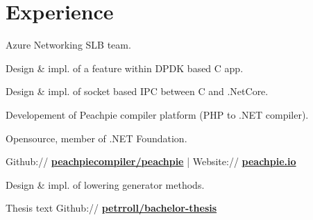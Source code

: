 \documentclass[a4paper]{deedy-resume} %
\begin{document}
%
\begin{minipage}[t]{0.62\textwidth} %


\section{Experience}


\vspace{\topsep} %
\begin{tightitemize}
\item Azure Networking SLB team.
\item Design \& impl. of a feature within DPDK based C app.
\item Design \& impl. of socket based IPC between C and .NetCore.
\end{tightitemize}

\sectionspace %



\begin{tightitemize}
\item Developement of Peachpie compiler platform (PHP to .NET compiler).
\item Opensource, member of .NET Foundation.
\item Github:// \href{https://github.com/peachpiecompiler/peachpie}{\bf peachpiecompiler/peachpie} | Website:// \href{https://www.peachpie.io/}{\bf peachpie.io}
\end{tightitemize}

\begin{tightitemize}
\item Design \& impl. of lowering generator methods.
\item Thesis text Github:// \href{https://github.com/petrroll/bachelor-thesis}{\bf petrroll/bachelor-thesis}
\end{tightitemize}



\end{minipage}
\end{document}
